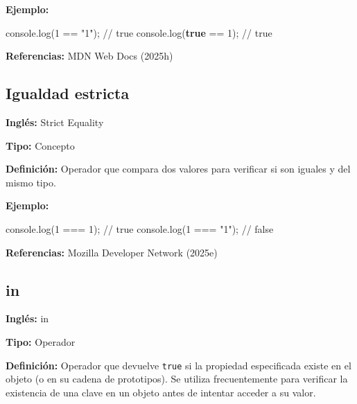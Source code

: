 \documentclass[
  letterpaper,
  DIV=11,
  numbers=noendperiod]{scrreprt}
\newenvironment{Shaded}{\begin{snugshade}}{\end{snugshade}}
\newcommand{\BuiltInTok}[1]{\textcolor[rgb]{0.00,0.23,0.31}{#1}}
\newcommand{\CommentTok}[1]{\textcolor[rgb]{0.37,0.37,0.37}{#1}}
\newcommand{\DecValTok}[1]{\textcolor[rgb]{0.68,0.00,0.00}{#1}}
\newcommand{\FunctionTok}[1]{\textcolor[rgb]{0.28,0.35,0.67}{#1}}
\newcommand{\KeywordTok}[1]{\textcolor[rgb]{0.00,0.23,0.31}{\textbf{#1}}}
\newcommand{\NormalTok}[1]{\textcolor[rgb]{0.00,0.23,0.31}{#1}}
\newcommand{\OperatorTok}[1]{\textcolor[rgb]{0.37,0.37,0.37}{#1}}
\newcommand{\StringTok}[1]{\textcolor[rgb]{0.13,0.47,0.30}{#1}}
\let\oldsubsection\subsection
\renewcommand{\subsection}{\phantomsection\oldsubsection}
\begin{document}
\textbf{Ejemplo:}

\begin{Shaded}
\begin{Highlighting}[]
\BuiltInTok{console}\OperatorTok{.}\FunctionTok{log}\NormalTok{(}\DecValTok{1} \OperatorTok{==} \StringTok{"1"}\NormalTok{)}\OperatorTok{;} \CommentTok{// true}
\BuiltInTok{console}\OperatorTok{.}\FunctionTok{log}\NormalTok{(}\KeywordTok{true} \OperatorTok{==} \DecValTok{1}\NormalTok{)}\OperatorTok{;} \CommentTok{// true}
\end{Highlighting}
\end{Shaded}

\textbf{Referencias:} MDN Web Docs (2025h)

\subsection*{Igualdad estricta}\label{glos-igualdad_estricta}

\textbf{Inglés:} Strict Equality

\textbf{Tipo:} Concepto

\textbf{Definición:} Operador que compara dos valores para verificar si
son iguales y del mismo tipo.

\textbf{Ejemplo:}

\begin{Shaded}
\begin{Highlighting}[]
\BuiltInTok{console}\OperatorTok{.}\FunctionTok{log}\NormalTok{(}\DecValTok{1} \OperatorTok{===} \DecValTok{1}\NormalTok{)}\OperatorTok{;}   \CommentTok{// true}
\BuiltInTok{console}\OperatorTok{.}\FunctionTok{log}\NormalTok{(}\DecValTok{1} \OperatorTok{===} \StringTok{"1"}\NormalTok{)}\OperatorTok{;} \CommentTok{// false}
\end{Highlighting}
\end{Shaded}

\textbf{Referencias:} Mozilla Developer Network (2025e)

\subsection*{in}\label{glos-in}

\textbf{Inglés:} in

\textbf{Tipo:} Operador

\textbf{Definición:} Operador que devuelve \texttt{true} si la propiedad
especificada existe en el objeto (o en su cadena de prototipos). Se
utiliza frecuentemente para verificar la existencia de una clave en un
objeto antes de intentar acceder a su valor.
\end{document}
